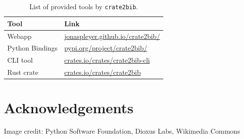\documentclass[11pt,a4paper]{article}
\begin{document}
\begin{table}[H]
    \centering
    \begin{tabular}{ll}
        \toprule
        Tool & Link\\
        \midrule
        Webapp & \href{https://jonaspleyer.github.io/crate2bib/}{jonaspleyer.github.io/crate2bib/}\\
        Python Bindings & \href{https://pypi.org/project/crate2bib/}{pypi.org/project/crate2bib/}\\
        CLI tool & \href{https://crates.io/crates/crate2bib-cli}{crates.io/crates/crate2bib-cli}\\
        Rust crate & \href{https://crates.io/crates/crate2bib}{crates.io/crates/crate2bib}\\
        \bottomrule
    \end{tabular}
    \caption{List of provided tools by \texttt{crate2bib}.}
\end{table}

\newpage
\section*{Acknowledgements}
Image credit: Python Software Foundation, Dioxus Labs, Wikimedia Commons

% 
% 
% 
\printbibliography
\end{document}
